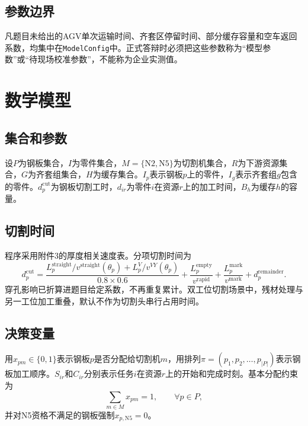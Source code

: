 \documentclass[UTF8,zihao=-4,openany]{ctexrep}
\newcommand{\code}[1]{\texttt{#1}}
\begin{document}
\section{参数边界}

凡题目未给出的AGV单次运输时间、齐套区停留时间、部分缓存容量和空车返回系数，均集中在\code{ModelConfig}中。正式答辩时必须把这些参数称为“模型参数”或“待现场校准参数”，不能称为企业实测值。

\chapter{数学模型}

\section{集合和参数}

设$P$为钢板集合，$I$为零件集合，$M=\{\mathrm{N2},\mathrm{N5}\}$为切割机集合，$R$为下游资源集合，$G$为齐套组集合，$H$为缓存集合。$I_p$表示钢板$p$上的零件，$I_g$表示齐套组$g$包含的零件。$d_p^{\mathrm{cut}}$为钢板切割工时，$d_{ir}$为零件$i$在资源$r$上的加工时间，$B_h$为缓存$h$的容量。

\section{切割时间}

程序采用附件3的厚度相关速度表。分项切割时间为
\begin{equation}
 d_p^{\mathrm{cut}}=
 \frac{L_p^{\mathrm{straight}}/v^{\mathrm{straight}}(\theta_p)
 +L_p^{V}/v^{VY}(\theta_p)}{0.8\times0.6}
 +\frac{L_p^{\mathrm{empty}}}{v^{\mathrm{rapid}}}
 +\frac{L_p^{\mathrm{mark}}}{v^{\mathrm{mark}}}
 +d_p^{\mathrm{remainder}}.
\end{equation}
穿孔影响已折算进题目给定系数，不再重复累计。双工位切割场景中，残材处理与另一工位加工重叠，默认不作为切割头串行占用时间。

\section{决策变量}

用$x_{pm}\in\{0,1\}$表示钢板$p$是否分配给切割机$m$，用排列$\pi=(p_1,p_2,\ldots,p_{|P|})$表示钢板加工顺序。$S_{ir}$和$C_{ir}$分别表示任务$i$在资源$r$上的开始和完成时刻。基本分配约束为
\begin{equation}
 \sum_{m\in M}x_{pm}=1,\qquad \forall p\in P,
\end{equation}
并对N5资格不满足的钢板强制$x_{p,\mathrm{N5}}=0$。
\end{document}
